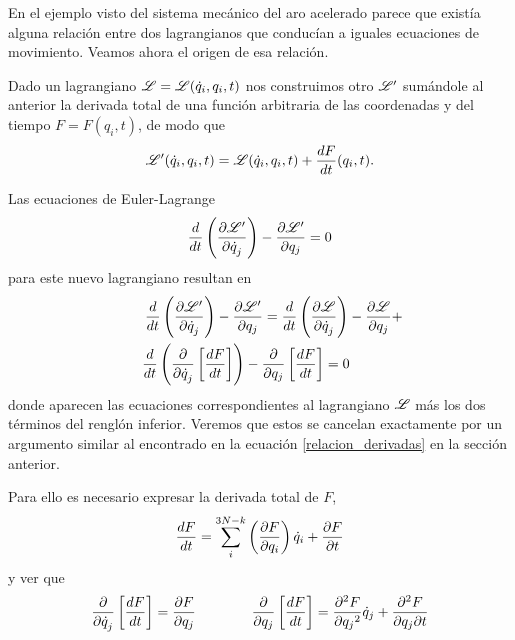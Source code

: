 \documentclass[10pt,oneside]{CBFT_book}
\begin{document}
En el ejemplo visto del sistema mecánico del aro acelerado parece que existía alguna relación entre dos 
lagrangianos que conducían a iguales ecuaciones de movimiento. Veamos ahora el origen de esa relación.

Dado un lagrangiano $\Lag = \Lag(\dot{q}_i,q_i,t)$ nos construimos otro $\Lag'$ sumándole al anterior la 
derivada total de una función arbitraria de las coordenadas y del tiempo $F=F(q_i,t)$, de modo que
\[
	\Lag'(\dot{q}_i,q_i,t) = \Lag(\dot{q}_i,q_i,t)+ \dtot{F}{t}(q_i,t) .
\]

Las ecuaciones de Euler-Lagrange 
\[
	\frac{d}{dt}\left(\dpar{\Lag'}{\dot{q}_j}\right) - \dpar{\Lag'}{q_j} = 0
\]
para este nuevo lagrangiano resultan en
\begin{multline}
 	\qquad \frac{d}{dt}\left(\dpar{\Lag'}{\dot{q}_j}\right) - \dpar{\Lag'}{q_j} =
 	\dtot{}{t}\left(\dpar{\Lag}{\dot{q}_j}\right) - \dpar{\Lag}{q_j} + \\
 	\dtot{}{t}\left(\dpar{}{\dot{q}_j}\left[ \dtot{F}{t} \right]\right) 
	- \dpar{}{q_j}\left[ \dtot{F}{t}\right] = 0 \qquad \label{ecEL_lag_suma}	
\end{multline}
donde aparecen las ecuaciones correspondientes al lagrangiano $\Lag$ más los dos términos del 
renglón inferior.
Veremos que estos se cancelan exactamente por un argumento similar al encontrado en la ecuación
\eqref{relacion_derivadas} en la sección anterior.

Para ello es necesario expresar la derivada total de $F$,
\[
	\dtot{F}{t} = \sum_i^{3N-k} \left( \dpar{F}{q_i} \right) \dot{q}_i + \dpar{F}{t}
\]
y ver que
\[
	\dpar{}{\dot{q}_j}\left[ \dtot{F}{t}\right] = \dpar{F}{q_j} \qquad\qquad
	\dpar{}{q_j}\left[ \dtot{F}{t}\right] = \dpar[2]{F}{q_j} \dot{q}_j + \dparcru{F}{t}{q_j} 
\]
\end{document}
